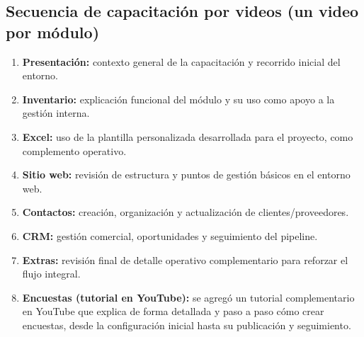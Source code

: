 \subsection{Secuencia de capacitación por videos (un video por módulo)}

\begin{enumerate}
    \item \textbf{Presentación:} contexto general de la capacitación y recorrido inicial del entorno.
    \item \textbf{Inventario:} explicación funcional del módulo y su uso como apoyo a la gestión interna.
    \item \textbf{Excel:} uso de la plantilla personalizada desarrollada para el proyecto, como complemento operativo.
    \item \textbf{Sitio web:} revisión de estructura y puntos de gestión básicos en el entorno web.
    \item \textbf{Contactos:} creación, organización y actualización de clientes/proveedores.
    \item \textbf{CRM:} gestión comercial, oportunidades y seguimiento del pipeline.
    \item \textbf{Extras:} revisión final de detalle operativo complementario para reforzar el flujo integral.
    \item \textbf{Encuestas (tutorial en YouTube):} se agregó un tutorial complementario en YouTube que explica de forma detallada y paso a paso cómo crear encuestas, desde la configuración inicial hasta su publicación y seguimiento.
\end{enumerate}

